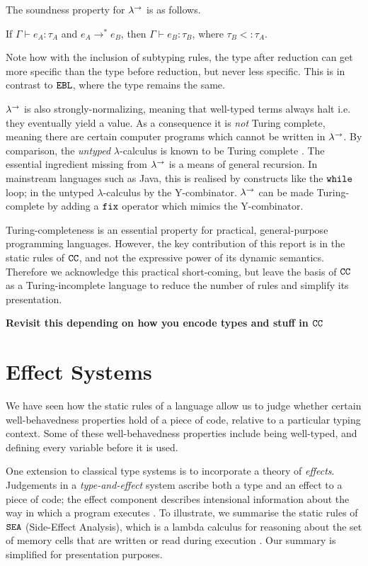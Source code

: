 The soundness property for $\lambda^{\rightarrow}$ is as follows.

\begin{theorem}
If $\Gamma \vdash e_A: \tau_A$ and $e_A \longrightarrow^* e_B$, then $\Gamma \vdash e_B: \tau_B$, where $\tau_B <: \tau_A$.
\end{theorem}

Note how with the inclusion of subtyping rules, the type after reduction can get more specific than the type before reduction, but never less specific. This is in contrast to $\mathtt{EBL}$, where the type remains the same.

$\lambda^{\rightarrow}$ is also strongly-normalizing, meaning that well-typed terms always halt i.e. they eventually yield a value. As a consequence it is \textit{not} Turing complete, meaning there are certain computer programs which cannot be written in $\lambda^{\rightarrow}$. By comparison, the \textit{untyped} $\lambda$-calculus is known to be Turing complete \cite{kleene43}. The essential ingredient missing from $\lambda^{\rightarrow}$ is a means of general recursion. In mainstream languages such as Java, this is realised by constructs like the $\mathtt{while}$ loop; in the untyped $\lambda$-calculus by the Y-combinator. $\lambda^{\rightarrow}$ can be made Turing-complete by adding a $\mathtt{fix}$ operator which mimics the Y-combinator.

Turing-completeness is an essential property for practical, general-purpose programming languages. However, the key contribution of this report is in the static rules of $\mathtt{CC}$, and not the expressive power of its dynamic semantics. Therefore we acknowledge this practical short-coming, but leave the basis of $\mathtt{CC}$ as a Turing-incomplete language to reduce the number of rules and simplify its presentation.

\textbf{Revisit this depending on how you encode types and stuff in $\mathtt{CC}$}


\section{Effect Systems}

We have seen how the static rules of a language allow us to judge whether certain well-behavedness properties hold of a piece of code, relative to a particular typing context. Some of these well-behavedness properties include being well-typed, and defining every variable before it is used.

One extension to classical type systems is to incorporate a theory of \textit{effects}. Judgements in a \textit{type-and-effect} system ascribe both a type and an effect to a piece of code; the effect component describes intensional information about the way in which a program executes \cite{nielson99}. To illustrate, we summarise the static rules of $\mathtt{SEA}$ (Side-Effect Analysis), which is a lambda calculus for reasoning about the set of memory cells that are written or read during execution \cite{nielson99}. Our summary is simplified for presentation purposes.


